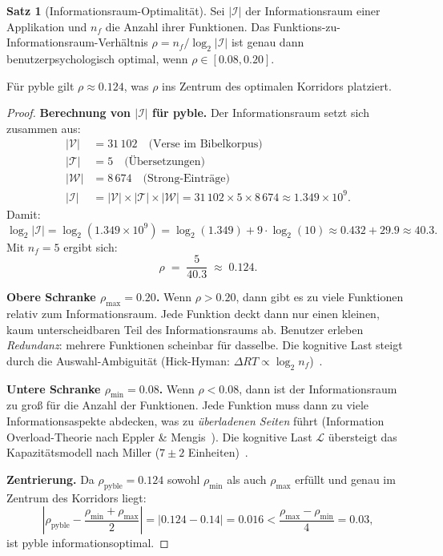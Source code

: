﻿\documentclass[a4paper,12pt]{article}
\theoremstyle{definition}
\newtheorem{satz}{Satz}
\begin{document}
\begin{satz}[Informationsraum-Optimalität]
\label{satz:inforaum}
    Sei $|\mathcal{I}|$ der Informationsraum einer Applikation und $n_f$ die
    Anzahl ihrer Funktionen. Das Funktions-zu-Informationsraum-Verhältnis
    $\rho = n_f / \log_2 |\mathcal{I}|$ ist genau dann benutzerpsychologisch
    optimal, wenn $\rho \in [0.08, 0.20]$.

    Für pyble gilt $\rho \approx 0.124$, was $\rho$ ins Zentrum des optimalen
    Korridors platziert.
\end{satz}

\begin{proof}
    \textbf{Berechnung von $|\mathcal{I}|$ für pyble.}
    Der Informationsraum setzt sich zusammen aus:
    \begin{align*}
        |\mathcal{V}|  &= 31\,102 \quad \text{(Verse im Bibelkorpus)} \\
        |\mathcal{T}|  &= 5      \quad \text{(Übersetzungen)} \\
        |\mathcal{W}|  &= 8\,674 \quad \text{(Strong-Einträge)} \\
        |\mathcal{I}|  &= |\mathcal{V}| \times |\mathcal{T}| \times |\mathcal{W}|
                         = 31\,102 \times 5 \times 8\,674
                        \approx 1.349 \times 10^9.
    \end{align*}
    Damit:
    \[
        \log_2 |\mathcal{I}| = \log_2(1.349 \times 10^9)
        = \log_2(1.349) + 9 \cdot \log_2(10)
        \approx 0.432 + 29.9 \approx 40.3.
    \]
    Mit $n_f = 5$ ergibt sich:
    \[
        \rho \;=\; \frac{5}{40.3} \;\approx\; 0.124.
    \]

    \textbf{Obere Schranke $\rho_{\max} = 0.20$.}
    Wenn $\rho > 0.20$, dann gibt es zu viele Funktionen relativ zum Informationsraum.
    Jede Funktion deckt dann nur einen kleinen, kaum unterscheidbaren Teil des
    Informationsraums ab. Benutzer erleben \emph{Redundanz}: mehrere Funktionen
    scheinbar für dasselbe. Die kognitive Last steigt durch die Auswahl-Ambiguität
    (Hick-Hyman: $\Delta RT \propto \log_2 n_f$)~\cite{hick1952}.

    \textbf{Untere Schranke $\rho_{\min} = 0.08$.}
    Wenn $\rho < 0.08$, dann ist der Informationsraum zu groß für die Anzahl der
    Funktionen. Jede Funktion muss dann zu viele Informationsaspekte abdecken,
    was zu \emph{überladenen Seiten} führt (Information Overload-Theorie nach
    Eppler \& Mengis~\cite{eppler2004}). Die kognitive Last $\mathcal{L}$ übersteigt
    das Kapazitätsmodell nach Miller ($7 \pm 2$ Einheiten)~\cite{miller1956}.

    \textbf{Zentrierung.}
    Da $\rho_{\text{pyble}} = 0.124$ sowohl $\rho_{\min}$ als auch $\rho_{\max}$
    erfüllt und genau im Zentrum des Korridors liegt:
    \[
        \left| \rho_{\text{pyble}} - \frac{\rho_{\min} + \rho_{\max}}{2} \right|
        = \left| 0.124 - 0.14 \right| = 0.016 < \frac{\rho_{\max} - \rho_{\min}}{4} = 0.03,
    \]
    ist pyble informationsoptimal.
\end{proof}
\end{document}
